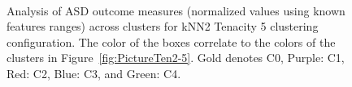 \documentclass{bmcart}
\begin{document}
\begin{figure}[thp]
    \centering
{}\hspace{2em}\\
    \caption[]{Analysis of ASD outcome measures (normalized values using known features ranges) across clusters for kNN2 Tenacity 5 clustering configuration. The color of the boxes correlate to the colors of the clusters in Figure~\ref{fig:PictureTen2-5}. Gold denotes C0, Purple: C1, Red: C2, Blue: C3, and Green: C4.}
    \label{fig:summ5cluster}
\end{figure}
\end{document}
